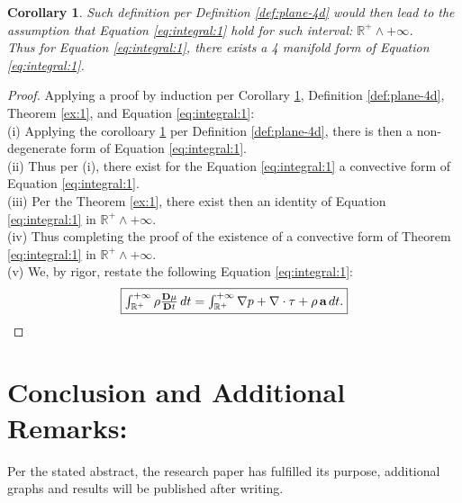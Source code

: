 \documentclass[10pt]{article}
\theoremstyle{plain}
\newtheorem{corollary}[theorem]{Corollary}
\theoremstyle{definition}
\theoremstyle{remark}
\begin{document}
\begin{corollary}
\label{cor:plane-4d}
Such definition per Definition \ref{def:plane-4d} would then lead to the assumption that Equation \ref{eq:integral:1} hold for such interval: $\mathbb{R}^{+} \land +\infty$.\\
Thus for Equation \ref{eq:integral:1}, there exists a 4 manifold form of Equation \ref{eq:integral:1}. 
\end{corollary}

\begin{proof}
  Applying a proof by induction per Corollary \ref{cor:plane-4d}, Definition \ref{def:plane-4d}, Theorem \ref{ex:1}, and Equation \ref{eq:integral:1}:\\
  (i) Applying the corolloary \ref{cor:plane-4d} per Definition \ref{def:plane-4d}, there is then a non-degenerate form of Equation \ref{eq:integral:1}.\\
  (ii) Thus per (i), there exist for the Equation \ref{eq:integral:1} a convective form of Equation \ref{eq:integral:1}.\\
  (iii) Per the Theorem \ref{ex:1}, there exist then an identity of Equation \ref{eq:integral:1} in $\mathbb{R}^{+} \land +\infty$.\\
  (iv) Thus completing the proof of the existence of a convective form of Theorem \ref{eq:integral:1} in $\mathbb{R}^{+} \land +\infty$.\\
  (v) We, by rigor, restate the following Equation \ref{eq:integral:1}:
  \begin{equation}
    \fbox{$\int_{\mathbb{R}^{+}}^{+\infty} \rho \frac{\mathbf{D}\mu}{\mathbf{D}t} \, dt = \int_{\mathbb{R}^{+}}^{+\infty} \nabla p + \nabla \cdot \tau + \rho \, \textbf{a} \, dt.$}
  \end{equation}
\end{proof}

\section{Conclusion and Additional Remarks:}

Per the stated abstract, the research paper has fulfilled its purpose, additional graphs and results will be published after writing.

\nocite{*}



\end{document}
